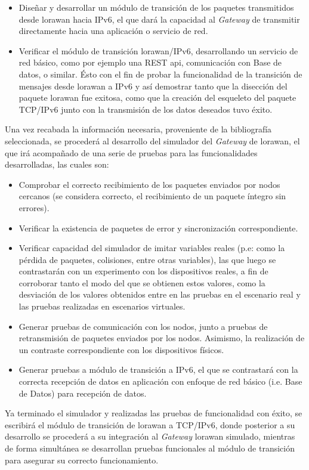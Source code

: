 \begin{justify}
\begin{itemize}
\item Diseñar y desarrollar un módulo de transición de los paquetes transmitidos desde \gls{lorawan} hacia IPv6, el que dará la capacidad al \textit{Gateway} de transmitir directamente hacia una aplicación o servicio de red.
\item Verificar el módulo de transición \gls{lorawan}/IPv6, desarrollando un servicio de red básico, como por ejemplo una REST \gls{api}, comunicación con Base de datos, o similar. Ésto con el fin de probar la funcionalidad de la transición de mensajes desde \gls{lorawan} a IPv6 y así demostrar tanto que la disección del paquete \gls{lorawan} fue exitosa, como que la creación del esqueleto del paquete TCP/IPv6 junto con la transmisión de los datos deseados tuvo éxito.
\end{itemize}

Una vez recabada la información necesaria, proveniente de la bibliografía seleccionada, se procederá al desarrollo del simulador del \textit{Gateway} de \gls{lorawan}, el que irá acompañado de una serie de pruebas para las funcionalidades desarrolladas, las cuales son:\\
\begin{itemize}
\item Comprobar el correcto recibimiento de los paquetes enviados por nodos cercanos (se considera correcto, el recibimiento de un paquete íntegro sin errores).
\item Verificar la existencia de paquetes de error y sincronización correspondiente.
\item Verificar capacidad del simulador de imitar variables reales (p.e: como la pérdida de paquetes, colisiones, entre otras variables), las que luego se contrastarán con un experimento con los dispositivos reales, a fin de corroborar tanto el modo del que se obtienen estos valores, como la desviación de los valores obtenidos entre en las pruebas en el escenario real y las pruebas realizadas en escenarios virtuales.
\item Generar pruebas de comunicación con los nodos, junto a pruebas de retransmisión de paquetes enviados por los nodos. Asimismo, la realización de un contraste correspondiente con los dispositivos físicos.
\item Generar pruebas a módulo de transición a IPv6, el que se contrastará con la correcta recepción de datos en aplicación con enfoque de red básico (i.e. Base de Datos) para recepción de datos.
\end{itemize}
Ya terminado el simulador y realizadas las pruebas de funcionalidad con éxito, se escribirá el módulo de transición de \gls{lorawan} a TCP/IPv6, donde posterior a su desarrollo se procederá a su integración al \textit{Gateway} \gls{lorawan} simulado, mientras de forma simultánea se desarrollan pruebas funcionales al módulo de transición para asegurar su correcto funcionamiento.
\end{justify}